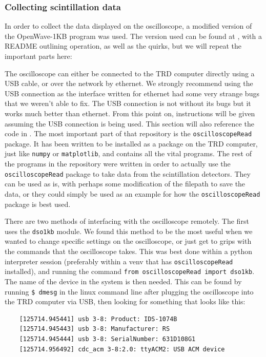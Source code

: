 \documentclass[11pt]{article}
\numberwithin{equation}{section}
\numberwithin{figure}{section}
\numberwithin{table}{section}
\begin{document}
\subsubsection{Collecting scintillation data}\label{sec:Collecting scintillation data}
\par In order to collect the data displayed on the oscilloscope, a modified version of the OpenWave-1KB \cite{Openwave} program was used. The version used can be found at \cite{Miles Git}, with a README outlining operation, as well as the quirks, but we will repeat the important parts here:
\par The oscilloscope can either be connected to the TRD computer directly using a USB cable, or over the network by ethernet. We strongly recommend using the USB connection as the interface written for ethernet had some very strange bugs that we weren't able to fix. The USB connection is not without its bugs but it works much better than ethernet. From this point on, instructions will be given assuming the USB connection is being used. This section will also reference the code in \cite{Miles Git}. The most important part of that repository is the \texttt{oscilloscopeRead} package. It has been written to be installed as a package on the TRD computer, just like \texttt{numpy} or \texttt{matplotlib}, and contains all the vital programs. The rest of the programs in the repository were written in order to actually use the \texttt{oscilloscopeRead} package to take data from the scintillation detectors. They can be used as is, with perhaps some modification of the filepath to save the data, or they could simply be used as an example for how the \texttt{oscilloscopeRead} package is best used. 
\newline
\par There are two methods of interfacing with the oscilloscope remotely. The first uses the \texttt{dso1kb} module. We found this method to be the most useful when we wanted to change specific settings on the oscilloscope, or just get to grips with the commands that the oscilloscope takes. This was best done within a python interpreter session (preferably within a venv that has \texttt{oscilloscopeRead} installed), and running the command \texttt{from oscilloscopeRead import dso1kb}. The name of the device in the system is then needed. This can be found by running \texttt{\$ dmesg} in the linux command line after plugging the oscilloscope into the TRD computer via USB, then looking for something that looks like this:
\begin{verbatim}
    [125714.945441] usb 3-8: Product: IDS-1074B
    [125714.945443] usb 3-8: Manufacturer: RS
    [125714.945444] usb 3-8: SerialNumber: 631D108G1
    [125714.956492] cdc_acm 3-8:2.0: ttyACM2: USB ACM device
\end{verbatim}
\end{document}
